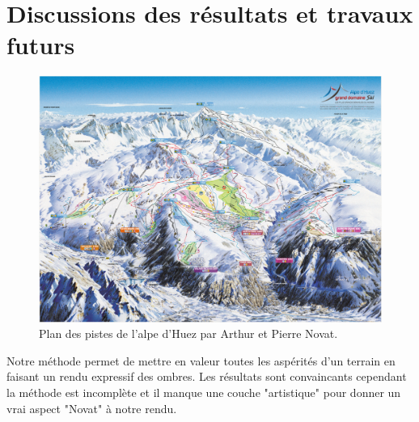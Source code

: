 \chapter{Discussions des résultats et travaux futurs}



\begin{figure}[!h]

   \centering
   \includegraphics[width=1.0\linewidth]{novat/AlpeHuez_pistes.png}
   \caption{Plan des pistes de l'alpe d'Huez par Arthur et Pierre Novat.}
\end{figure}














Notre méthode permet de mettre en valeur toutes les aspérités d'un terrain en faisant un rendu expressif des ombres. Les résultats sont convaincants cependant la méthode est incomplète et il manque une couche "artistique" pour donner un vrai aspect "Novat" à notre rendu. 
